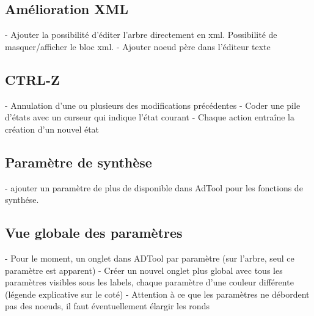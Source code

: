 	\subsection{Amélioration XML}

	- Ajouter la possibilité d'éditer l'arbre directement en xml. Possibilité de masquer/afficher le bloc xml.
	- Ajouter noeud père dans l'éditeur texte 
	
	\subsection{CTRL-Z}

	- Annulation d'une ou plusieurs des modifications précédentes
	- Coder une pile d'états avec un curseur qui indique l'état courant
	- Chaque action entraîne la création d'un nouvel état
	
	\subsection{Paramètre de synthèse}
	- ajouter un paramètre de plus de disponible dans AdTool pour les fonctions de synthése.
		
	\subsection{Vue globale des paramètres}

	- Pour le moment, un onglet dans ADTool par paramètre (sur l'arbre, seul ce paramètre est apparent)	
	- Créer un nouvel onglet plus global avec tous les paramètres visibles sous les labels, chaque paramètre d'une couleur différente (légende explicative sur le coté)
	- Attention à ce que les paramètres ne débordent pas des noeuds, il faut éventuellement élargir les ronds